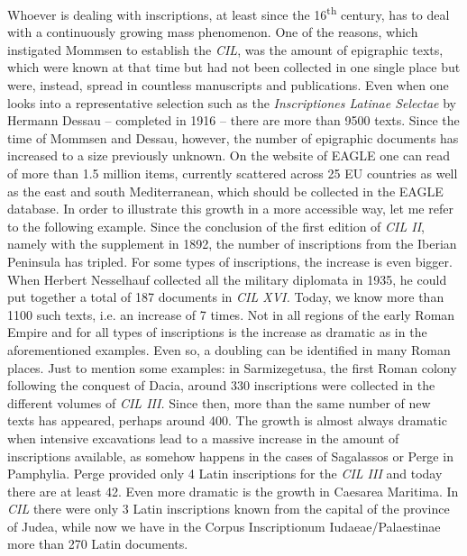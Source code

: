 \documentclass{article}
\begin{document}
Whoever is dealing with inscriptions, at least since the 16\textsuperscript{th} 
century, has to deal with a continuously growing mass phenomenon. One of the reasons, 
which instigated Mommsen to establish the \textit{CIL}, was the amount of epigraphic 
texts, which were known at that time but had not been collected in one single place 
but were, instead, spread in countless manuscripts and publications. Even when 
one looks into a representative selection such as the \textit{Inscriptiones Latinae 
Selectae }by Hermann Dessau – completed in 1916 – there are more than 9500 
texts. Since the time of Mommsen and Dessau, however, the number of epigraphic 
documents has increased to a size previously unknown. On the website of EAGLE one 
can read of more than 1.5 million items, currently scattered across 25 EU countries 
as well as the east and south Mediterranean, which should be collected in the EAGLE 
database. In order to illustrate this growth in a more accessible way, let me refer 
to the following example. Since the conclusion of the first edition of \textit{CIL 
II}, namely with the supplement in 1892, the number of inscriptions from the Iberian 
Peninsula has tripled. For some types of inscriptions, the increase is even bigger. 
When Herbert Nesselhauf collected all the military diplomata in 1935, he could 
put together a total of 187 documents in \textit{CIL XVI. }Today, we know more 
than 1100 such texts, i.e. an increase of 7 times. Not in all regions of the early 
Roman Empire and for all types of inscriptions is the increase as dramatic as in 
the aforementioned examples. Even so, a doubling can be identified in many Roman 
places. Just to mention some examples: in Sarmizegetusa, the first Roman colony 
following the conquest of Dacia, around 330 inscriptions were collected in the 
different volumes of \textit{CIL III.} Since then, more than the same number of 
new texts has appeared, perhaps around 400. The growth is almost always dramatic 
when intensive excavations lead to a massive increase in the amount of inscriptions 
available, as somehow happens in the cases of Sagalassos or Perge in Pamphylia. 
Perge provided only 4 Latin inscriptions for the \textit{CIL III} and today there 
are at least 42. Even more dramatic is the growth in Caesarea Maritima. In \textit{CIL 
}there were only 3 Latin inscriptions known from the capital of the province of 
Judea, while now we have in the Corpus Inscriptionum Iudaeae/Palaestinae more than 
270 Latin documents.   
\end{document}
